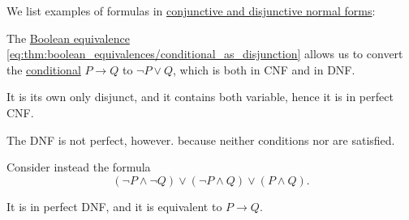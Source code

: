 \begin{example}\label{ex:def:cnf_and_dnf}
  We list examples of formulas in \hyperref[def:cnf_and_dnf]{conjunctive and disjunctive normal forms}:
  \begin{thmenum}
     The \hyperref[thm:boolean_equivalences]{Boolean equivalence} \eqref{eq:thm:boolean_equivalences/conditional_as_disjunction} allows us to convert the \hyperref[def:propositional_language/connectives/conditional]{conditional} \( P \to Q \) to \( \neg P \vee Q \), which is both in CNF and in DNF.

    It is its own only disjunct, and it contains both variable, hence it is in perfect CNF.

    The DNF is not perfect, however. because neither conditions  nor  are satisfied.

     Consider instead the formula
    \begin{equation*}
      (\neg P \wedge \neg Q) \vee (\neg P \wedge Q) \vee (P \wedge Q).
    \end{equation*}

    It is in perfect DNF, and it is equivalent to \( P \to Q \).
  \end{thmenum}
\end{example}

